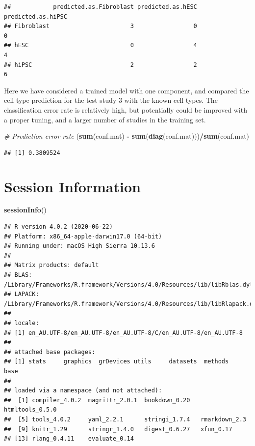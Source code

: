 \documentclass[]{book}
\newenvironment{Shaded}{\begin{snugshade}}{\end{snugshade}}
\newcommand{\CommentTok}[1]{\textcolor[rgb]{0.56,0.35,0.01}{\textit{#1}}}
\newcommand{\KeywordTok}[1]{\textcolor[rgb]{0.13,0.29,0.53}{\textbf{#1}}}
\newcommand{\NormalTok}[1]{#1}
\newcommand{\OperatorTok}[1]{\textcolor[rgb]{0.81,0.36,0.00}{\textbf{#1}}}
\newcommand{\StringTok}[1]{\textcolor[rgb]{0.31,0.60,0.02}{#1}}
\begin{document}
\begin{verbatim}
##            predicted.as.Fibroblast predicted.as.hESC predicted.as.hiPSC
## Fibroblast                       3                 0                  0
## hESC                             0                 4                  4
## hiPSC                            2                 2                  6
\end{verbatim}

Here we have considered a trained model with one component, and compared the cell type prediction for the test study 3 with the known cell types. The classification error rate is relatively high, but potentially could be improved with a proper tuning, and a larger number of studies in the training set.

\begin{Shaded}
\begin{Highlighting}[]
\CommentTok{# Prediction error rate}
\NormalTok{(}\KeywordTok{sum}\NormalTok{(conf.mat) }\OperatorTok{-}\StringTok{ }\KeywordTok{sum}\NormalTok{(}\KeywordTok{diag}\NormalTok{(conf.mat)))}\OperatorTok{/}\KeywordTok{sum}\NormalTok{(conf.mat)}
\end{Highlighting}
\end{Shaded}

\begin{verbatim}
## [1] 0.3809524
\end{verbatim}

\hypertarget{session-information}{%
\chapter{Session Information}\label{session-information}}

\begin{Shaded}
\begin{Highlighting}[]
\KeywordTok{sessionInfo}\NormalTok{()}
\end{Highlighting}
\end{Shaded}

\begin{verbatim}
## R version 4.0.2 (2020-06-22)
## Platform: x86_64-apple-darwin17.0 (64-bit)
## Running under: macOS High Sierra 10.13.6
## 
## Matrix products: default
## BLAS:   /Library/Frameworks/R.framework/Versions/4.0/Resources/lib/libRblas.dylib
## LAPACK: /Library/Frameworks/R.framework/Versions/4.0/Resources/lib/libRlapack.dylib
## 
## locale:
## [1] en_AU.UTF-8/en_AU.UTF-8/en_AU.UTF-8/C/en_AU.UTF-8/en_AU.UTF-8
## 
## attached base packages:
## [1] stats     graphics  grDevices utils     datasets  methods   base     
## 
## loaded via a namespace (and not attached):
##  [1] compiler_4.0.2  magrittr_2.0.1  bookdown_0.20   htmltools_0.5.0
##  [5] tools_4.0.2     yaml_2.2.1      stringi_1.7.4   rmarkdown_2.3  
##  [9] knitr_1.29      stringr_1.4.0   digest_0.6.27   xfun_0.17      
## [13] rlang_0.4.11    evaluate_0.14
\end{verbatim}


\end{document}

